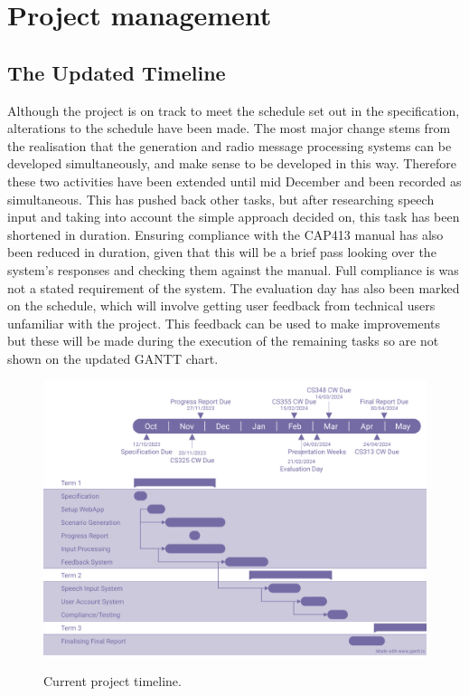 \section{Project management}


\subsection{The Updated Timeline}
Although the project is on track to meet the schedule set out in the specification, alterations to the schedule have been made. The most major change stems from the realisation that the generation and radio message processing systems can be developed simultaneously, and make sense to be developed in this way. Therefore these two activities have been extended until mid December and been recorded as simultaneous. This has pushed back other tasks, but after researching speech input and taking into account the simple approach decided on, this task has been shortened in duration. Ensuring compliance with the CAP413 manual has also been reduced in duration, given that this will be a brief pass looking over the system's responses and checking them against the manual. Full compliance is was not a stated requirement of the system. The evaluation day has also been marked on the schedule, which will involve getting user feedback from technical users unfamiliar with the project. This feedback can be used to make improvements but these will be made during the execution of the remaining tasks so are not shown on the updated GANTT chart.

\begin{figure}[H]
    \centering
	\includegraphics[scale = 0.3]{../document-resources/images/second-gantt}
    \label{progress-report-gantt}
    \caption{Current project timeline.}
\end{figure}

